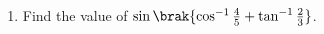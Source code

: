 \begin{enumerate}
\item Find the value of $\sin\brak{\cos^{-1}{\frac{4}{5}}+{\tan^{-1}{\frac{2}{3}}}}$.
\end{enumerate}